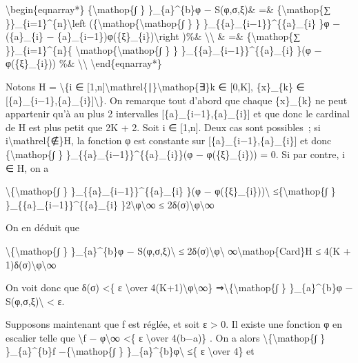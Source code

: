 \documentclass[]{article}
\begin{document}
\textbackslash{}begin\{eqnarray*\} \{\textbackslash{}mathop\{∫ \}
\}\_\{a\}\^{}\{b\}φ − S(φ,σ,ξ)\& =\& \{\textbackslash{}mathop\{∑
\}\}\_\{i=1\}\^{}\{n\}\textbackslash{}left
(\{\textbackslash{}mathop\{\textbackslash{}mathop\{∫ \} \}
\}\_\{\{a\}\_\{i−1\}\}\^{}\{\{a\}\_\{i\} \}φ − (\{a\}\_\{i\} −
\{a\}\_\{i−1\})φ(\{ξ\}\_\{i\})\textbackslash{}right )\%\&
\textbackslash{}\textbackslash{} \& =\& \{\textbackslash{}mathop\{∑
\}\}\_\{i=1\}\^{}\{n\}\{
\textbackslash{}mathop\{\textbackslash{}mathop\{∫ \} \}
\}\_\{\{a\}\_\{i−1\}\}\^{}\{\{a\}\_\{i\} \}(φ − φ(\{ξ\}\_\{i\})) \%\&
\textbackslash{}\textbackslash{} \textbackslash{}end\{eqnarray*\}

Notons H = \textbackslash{}\{i ∈
{[}1,n{]}\textbackslash{}mathrel\{∣\}\textbackslash{}mathop\{∃\}k ∈
{[}0,K{]}, \{x\}\_\{k\} ∈
{[}\{a\}\_\{i−1\},\{a\}\_\{i\}{]}\textbackslash{}\}. On remarque tout
d'abord que chaque \{x\}\_\{k\} ne peut appartenir qu'à au plus 2
intervalles {[}\{a\}\_\{i−1\},\{a\}\_\{i\}{]} et que donc le cardinal de
H est plus petit que 2K + 2. Soit i ∈ {[}1,n{]}. Deux cas sont
possibles~; si i\textbackslash{}mathrel\{∉\}H, la fonction φ est
constante sur {[}\{a\}\_\{i−1\},\{a\}\_\{i\}{]} et donc
\{\textbackslash{}mathop\{∫ \}
\}\_\{\{a\}\_\{i−1\}\}\^{}\{\{a\}\_\{i\}\}(φ − φ(\{ξ\}\_\{i\})) = 0. Si
par contre, i ∈ H, on a

\textbackslash{}\textbar{}\{\textbackslash{}mathop\{∫ \}
\}\_\{\{a\}\_\{i−1\}\}\^{}\{\{a\}\_\{i\} \}(φ −
φ(\{ξ\}\_\{i\}))\textbackslash{}\textbar{} ≤\{\textbackslash{}mathop\{∫
\} \}\_\{\{a\}\_\{i−1\}\}\^{}\{\{a\}\_\{i\}
\}2\textbackslash{}\textbar{}φ\textbackslash{}\textbar{}∞ ≤
2δ(σ)\textbackslash{}\textbar{}φ\textbackslash{}\textbar{}∞

On en déduit que

\textbackslash{}\textbar{}\{\textbackslash{}mathop\{∫ \}
\}\_\{a\}\^{}\{b\}φ − S(φ,σ,ξ)\textbackslash{}\textbar{} ≤
2δ(σ)\textbackslash{}\textbar{}φ\textbackslash{}\textbar{}
∞\textbackslash{}mathop\{Card\}H ≤ 4(K +
1)δ(σ)\textbackslash{}\textbar{}φ\textbackslash{}\textbar{}∞

On voit donc que δ(σ) \textless{}\{ ε \textbackslash{}over
4(K+1)\textbackslash{}\textbar{}φ\textbackslash{}\textbar{}∞\}
⇒\textbackslash{}\textbar{}\{\textbackslash{}mathop\{∫ \}
\}\_\{a\}\^{}\{b\}φ − S(φ,σ,ξ)\textbackslash{}\textbar{} \textless{} ε.

Supposons maintenant que f est réglée, et soit ε \textgreater{} 0. Il
existe une fonction φ en escalier telle que \textbackslash{}\textbar{}f
− φ\textbackslash{}\textbar{}∞ \textless{}\{ ε \textbackslash{}over
4(b−a)\} . On a alors
\textbackslash{}\textbar{}\{\textbackslash{}mathop\{∫ \}
\}\_\{a\}\^{}\{b\}f −\{\textbackslash{}mathop\{∫ \}
\}\_\{a\}\^{}\{b\}φ\textbackslash{}\textbar{} ≤\{ ε \textbackslash{}over
4\} et
\end{document}
